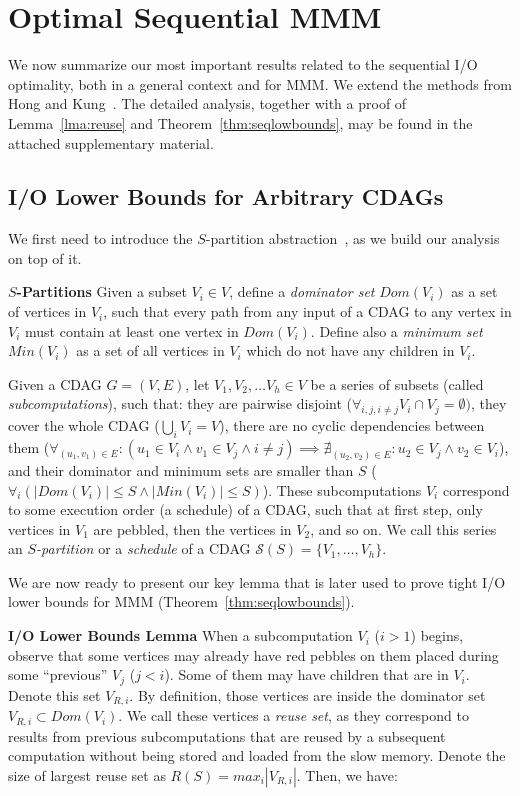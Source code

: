 \documentclass[sigplan,review,anonymous,10pt]{acmart}\settopmatter{printfolios=true,printccs=false,printacmref=false}
\newcommand{\macb}[1]{\textbf{\textsf{#1}}}
\begin{document}
\section{Optimal Sequential MMM}
\label{sec:seqScheduling}

We now summarize our most important results related to the sequential I/O
optimality, both in a general context and for MMM. We extend the methods from 
Hong and
Kung~\cite{redblue}. The detailed analysis, together with a proof of
Lemma~\ref{lma:reuse} and Theorem~\ref{thm:seqlowbounds}, may be found in the
attached supplementary material.

\subsection{I/O Lower Bounds for Arbitrary CDAGs}
\label{sec:iolowerbounds}

We first need to introduce the $S$-partition abstraction~\cite{redblue}, as we 
build our analysis on top of it.

\macb{$S$-Partitions}
%
Given a subset $V_i \in V$, define a \emph{dominator set} $Dom(V_i)$ as a set 
of 
vertices in $V_i$, such that every path from any input of a 
CDAG to any vertex in $V_i$ must contain at least one vertex in $Dom(V_i)$. 
Define 
also a \emph{minimum set} $Min(V_i)$ as a set of all vertices in $V_i$ which do 
not 
have any children in $V_i$.

Given a CDAG $G = (V,E)$, let $V_1, V_2, \dots V_h \in V$ be a series of 
subsets (called \emph{subcomputations}), such that: they are 
pairwise disjoint ($\forall_{i,j, i \ne j}V_i \cap V_j = \emptyset )$, they 
cover the whole CDAG ($\bigcup_i V_i = V$),
there are no cyclic dependencies between them ($\forall_{(u_1,v_1) \in E}: (u_1 
\in V_i \land v_1 \in V_j  \land i \ne j) \implies \nexists_{(u_2,v_2) \in E}: 
u_2 \in V_j \land v_2 \in V_i$), and their dominator and minimum sets are 
smaller than $S$ ($\forall_i (|Dom(V_i)| \le S \land |Min(V_i)| \le S)$).
These subcomputations $V_i$ correspond to some execution order (a schedule) of 
a CDAG, such that at first step, only vertices in $V_1$ are pebbled, then the 
vertices in $V_2$, and so on. We call this series an \emph{$S$-partition} or a 
\emph{schedule} of a 
CDAG $\mathcal{S}(S) = \{V_1, \dots, V_h\}$.

We are now ready to present our key lemma that is later used to prove tight I/O 
lower 
bounds for 
MMM
(Theorem~\ref{thm:seqlowbounds}). 

\macb{I/O Lower Bounds Lemma}
%
When a subcomputation $V_i$ ($i > 1$) begins, observe that some vertices may
already 
have red pebbles on them placed during some ``previous'' $V_j$ ($j < i$). 
Some 
of them may have children that are in $V_i$. Denote this set 
$V_{R,i}$. By 
definition, those vertices are inside the dominator set $V_{R,i} \subset 
Dom(V_i)$. We call 
these vertices a \emph{reuse set}, as they correspond to results from 
previous subcomputations that are reused by a subsequent computation without 
being stored and loaded from the slow memory. Denote the size of largest reuse 
set as $R(S) = max_i|V_{R,i}|$. Then, we have:
\end{document}
